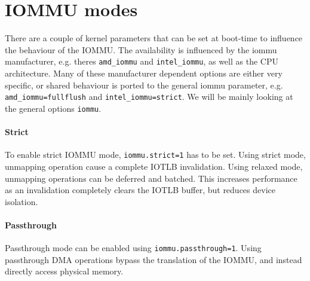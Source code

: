 \section{IOMMU modes}
There are a couple of kernel parameters that can be set at boot-time to influence the behaviour of the IOMMU. The availability is influenced by the iommu manufacturer, e.g. theres \texttt{amd\_iommu} and \texttt{intel\_iommu}, as well as the CPU architecture. Many of these manufacturer dependent options are either very specific, or shared behaviour is ported to the general iommu parameter, e.g. \texttt{amd\_iommu=fullflush} and \texttt{intel\_iommu=strict}. We will be mainly looking at the general options \texttt{iommu}.

\paragraph{Strict}
To enable strict IOMMU mode, \texttt{iommu.strict=1} has to be set. Using strict mode, unmapping operation cause a complete IOTLB invalidation. Using relaxed mode, unmapping operations can be deferred and batched. This increases performance as an invalidation completely clears the IOTLB buffer, but reduces device isolation.

\paragraph{Passthrough}
Passthrough mode can be enabled using \texttt{iommu.passthrough=1}. Using passthrough DMA operations bypass the translation of the IOMMU, and instead directly access physical memory.